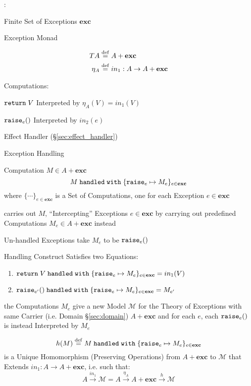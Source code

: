 \cite{plotkin-pretnar13}:

Finite Set of Exceptions $\mathbf{exc}$

Exception Monad

\begin{align*}
     T A & \stackrel{\mathrm{def}}= A + \mathbf{exc} \\
  \eta_A & \stackrel{\mathrm{def}}= in_1 : A \rightarrow A + \mathbf{exc}
\end{align*}

Computations:

$\mathtt{return}\; V$ Interpreted by $\eta_A(V) = in_1(V)$

$\mathtt{raise}_e()$ Interpreted by $in_2(e)$

Effect Handler (\S\ref{sec:effect_handler})

Exception Handling

Computation $M \in A + \mathbf{exc}$
\[
  M \;\mathtt{handled\;with}\;
    \{\mathtt{raise}_e \mapsto M_e \}_{e\in\mathbf{exc}}
\]
where $\{\cdots\}_{e\in\mathbf{exc}}$ is a Set of Computations, one
for each Exception $e \in \mathbf{exc}$

carries out $M$, ``Intercepting'' Exceptions $e \in \mathbf{exc}$ by
carrying out predefined Computations $M_e \in A + \mathbf{exc}$
instead

Un-handled Exceptions take $M_e$ to be $\mathtt{raise}_e()$

Handling Construct Satisfies two Equations:
\begin{enumerate}
  \item $\mathtt{return}\; V \;\mathtt{handled\;with}\;
    \{\mathtt{raise}_e \mapsto M_e\}_{e \in \mathbf{exc}}
    = in_1(V)$
  \item $\mathtt{raise}_{e'}() \;\mathtt{handled\;with}\;
    \{\mathtt{raise}_e \mapsto M_e\}_{e \in \mathbf{exc}}
    = M_{e'}$
\end{enumerate}

the Computations $M_e$ give a new Model $\mathcal{M}$ for the Theory
of Exceptions with same Carrier (i.e. Domain \S\ref{sec:domain}) $A +
\mathbf{exc}$ and for each $e$, each $\mathtt{raise}_e ()$ is instead
Interpreted by $M_e$

\[
  h(M) \stackrel{\mathrm{def}}= M \;\mathtt{handled\;with}\;
    \{\mathtt{raise}_e \mapsto M_e\}_{e \in \mathbf{exc}}
\]
is a Unique Homomorphism (Preserving Operations) from $A +
\mathbf{exc}$ to $\mathcal{M}$ that Extends $in_1 : A \rightarrow A +
\mathbf{exc}$, i.e. such that:
\[
  A \xrightarrow{in_1} \mathcal{M} =
    A \xrightarrow{\eta_A} A + \mathbf{exc} \xrightarrow{h} \mathcal{M}
\]

